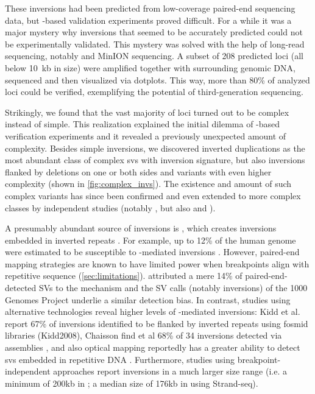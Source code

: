 These inversions had been predicted from low-coverage paired-end sequencing data,
but \pcr-based validation experiments proved difficult. For a while it was a
major mystery why inversions that seemed to be accurately predicted could not be
experimentally validated. This mystery was solved with the help of long-read
sequencing, notably \pacbio and \ont MinION sequencing. A subset of 208 predicted
loci (all below 10~kb in size) were amplified together with surrounding genomic
DNA, sequenced and then visualized via dotplots. This way, more than 80\% of
analyzed loci could be verified, exemplifying the potential of third-generation
sequencing.

Strikingly, we found that the vast majority of loci turned out to be complex
instead of simple. This realization explained the initial dilemma of
\pcr-based verification experiments and it revealed a previously unexpected
amount of complexity. Besides simple inversions, we discovered inverted
duplications as the most abundant class of complex \acp{sv} with inversion
signature, but also inversions flanked by deletions on one or both sides and
variants with even higher complexity (shown in \cref{fig:complex_invs}). The
existence and amount of such complex variants has since been confirmed and even
extended to more complex classes by independent studies (notably
\citet{Collins2017}, but also \citet{Sanders2016} and \citet[fig. 7]{English2015}).

A presumably abundant source of inversions is \nahr, which creates
inversions embedded in inverted repeats \citep{Carvalho2016}. For example, up to
12\% of the human genome were estimated to be susceptible to \nahr-mediated
inversions \citep{Dittwald2013}. However, paired-end mapping strategies are
known to have limited power when \sv breakpoints align with repetitive sequence
(\cref{sec:limitations}). \citet{Korbel2007} attributed a mere 14\% of
paired-end-detected SVs to the \nahr mechanism and the SV calls (notably
inversions) of the 1000 Genomes Project underlie a similar detection bias.
In contrast, studies using alternative
technologies reveal higher levels of \nahr-mediated inversions: Kidd et al.
report 67\% of inversions identified to be flanked by inverted repeats using
fosmid libraries (Kidd2008), Chaisson find et al 68\% of 34 inversions detected
via \pacbio assemblies \citep{Chaisson2014}, and also optical mapping reportedly
has a greater ability to detect \acp{sv} embedded in repetitive DNA
\citep[fig. 6]{Teague2010}. Furthermore, studies using breakpoint-independent
approaches report inversions in a much larger size range (i.e. a minimum of 200kb
in \citet{Bansal2007}; a median size of 176kb in \citet{Sanders2016} using
Strand-seq).

